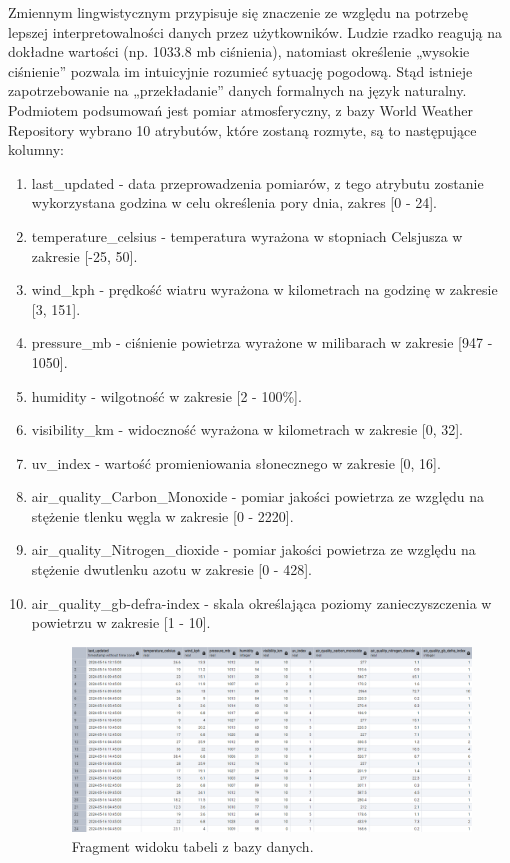 \documentclass{article}
\begin{document}
Zmiennym lingwistycznym przypisuje się znaczenie ze względu na potrzebę lepszej interpretowalności danych przez użytkowników. Ludzie rzadko reagują na dokładne wartości (np. 1033.8 mb ciśnienia), natomiast określenie „wysokie ciśnienie” pozwala im intuicyjnie rozumieć sytuację pogodową. Stąd istnieje zapotrzebowanie na „przekładanie” danych formalnych na język naturalny. \\
Podmiotem podsumowań jest pomiar atmosferyczny, z bazy World Weather Repository wybrano 10 atrybutów, które zostaną rozmyte, są to następujące kolumny:
\begin{enumerate}
    \item last\_updated - data przeprowadzenia pomiarów, z tego atrybutu zostanie wykorzystana godzina w celu określenia pory dnia, zakres [0 - 24]. 
    \item temperature\_celsius - temperatura wyrażona w stopniach Celsjusza w zakresie [-25, 50].
    \item wind\_kph - prędkość wiatru wyrażona w kilometrach na godzinę w zakresie [3, 151]. 
    \item pressure\_mb - ciśnienie powietrza wyrażone w milibarach w zakresie [947 - 1050]. 
    \item humidity - wilgotność w zakresie [2 - 100\%].
    \item visibility\_km - widoczność wyrażona w kilometrach w zakresie [0, 32].
    \item uv\_index - wartość promieniowania słonecznego w zakresie [0, 16].
    \item air\_quality\_Carbon\_Monoxide - pomiar jakości powietrza ze względu na stężenie tlenku węgla w zakresie [0 - 2220].
    \item air\_quality\_Nitrogen\_dioxide - pomiar jakości powietrza ze względu na stężenie dwutlenku azotu w zakresie [0 - 428].
    \item air\_quality\_gb-defra-index - skala określająca poziomy zanieczyszczenia w powietrzu w zakresie [1 - 10].

    \begin{figure}[H]
    \centering
    \includegraphics[width=\textwidth]{img/table.png}
    \caption{Fragment widoku tabeli z bazy danych.}
    \end{figure}
    
\end{enumerate}
\end{document}

